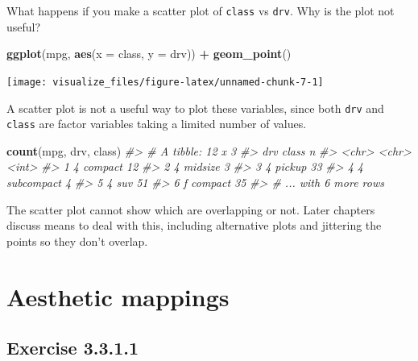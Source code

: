 \documentclass[]{book}
\newenvironment{Shaded}{\begin{snugshade}}{\end{snugshade}}
\newcommand{\CommentTok}[1]{\textcolor[rgb]{0.56,0.35,0.01}{\textit{#1}}}
\newcommand{\DataTypeTok}[1]{\textcolor[rgb]{0.13,0.29,0.53}{#1}}
\newcommand{\KeywordTok}[1]{\textcolor[rgb]{0.13,0.29,0.53}{\textbf{#1}}}
\newcommand{\NormalTok}[1]{#1}
\newcommand{\OperatorTok}[1]{\textcolor[rgb]{0.81,0.36,0.00}{\textbf{#1}}}
\newcommand{\StringTok}[1]{\textcolor[rgb]{0.31,0.60,0.02}{#1}}
\theoremstyle{plain}
\theoremstyle{remark}
\begin{document}
What happens if you make a scatter plot of \texttt{class} vs \texttt{drv}. Why is the plot not useful?

\begin{Shaded}
\begin{Highlighting}[]
\KeywordTok{ggplot}\NormalTok{(mpg, }\KeywordTok{aes}\NormalTok{(}\DataTypeTok{x =}\NormalTok{ class, }\DataTypeTok{y =}\NormalTok{ drv)) }\OperatorTok{+}
\StringTok{  }\KeywordTok{geom_point}\NormalTok{()}
\end{Highlighting}
\end{Shaded}

\begin{center}\texttt{[image: visualize\_files/figure-latex/unnamed-chunk-7-1]} \end{center}

A scatter plot is not a useful way to plot these variables, since both \texttt{drv} and \texttt{class} are factor variables taking a limited number of values.

\begin{Shaded}
\begin{Highlighting}[]
\KeywordTok{count}\NormalTok{(mpg, drv, class)}
\CommentTok{#> # A tibble: 12 x 3}
\CommentTok{#>   drv   class          n}
\CommentTok{#>   <chr> <chr>      <int>}
\CommentTok{#> 1 4     compact       12}
\CommentTok{#> 2 4     midsize        3}
\CommentTok{#> 3 4     pickup        33}
\CommentTok{#> 4 4     subcompact     4}
\CommentTok{#> 5 4     suv           51}
\CommentTok{#> 6 f     compact       35}
\CommentTok{#> # ... with 6 more rows}
\end{Highlighting}
\end{Shaded}

The scatter plot cannot show which are overlapping or not.
Later chapters discuss means to deal with this, including alternative plots and jittering the points so they don't overlap.

\hypertarget{aesthetic-mappings}{%
\section{Aesthetic mappings}\label{aesthetic-mappings}}

\hypertarget{exercise-3.3.1.1}{%
\subsection*{\texorpdfstring{Exercise {3.3.1.1}}{Exercise 3.3.1.1}}\label{exercise-3.3.1.1}}
\end{document}

